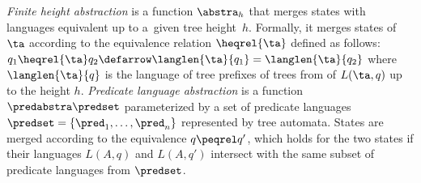 {\emph{Finite height abstraction} 
 is a function $\abstra_h$ that merges states 
 with languages equivalent
up to a~given tree height~$h$.
Formally, it merges states of~$\ta$ according to the equivalence relation $\heqrel{\ta}$ defined as follows:
$q_1 \heqrel{\ta} q_2 \defarrow \langlen{\ta}{q_1} = \langlen{\ta}{q_2}$ where
$\langlen{\ta}{q}$ is the language of tree prefixes of trees from of $L(\ta,q)$  
 up to the height $h$.
%
%
%
\emph{Predicate language abstraction}
is a function $\predabstra \predset$ parameterized by a set of predicate languages $\predset=\{\pred_1, \ldots, \pred_n\}$
represented by tree automata.
%
States are merged according to the equivalence $q \peqrel q'$, which holds for the two states if
their languages $L(A,q)$ and $L(A,q')$ intersect with the same subset of predicate languages from $\predset$.
%



}
